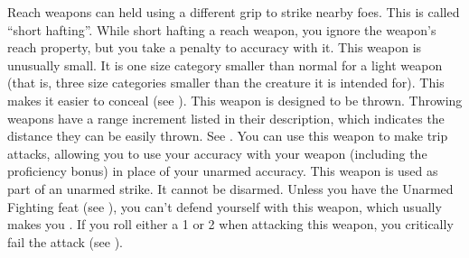 Reach weapons can held using a different grip to strike nearby foes. This is called ``short hafting''. While short hafting a reach weapon, you ignore the weapon's reach property, but you take a  penalty to accuracy with it.
 This weapon is unusually small. It is one size category smaller than normal for a light weapon (that is, three size categories smaller than the creature it is intended for). This makes it easier to conceal (see ).
 This weapon is designed to be thrown. Throwing weapons have a range increment listed in their description, which indicates the distance they can be easily thrown. See .
 You can use this weapon to make trip attacks, allowing you to use your accuracy with your weapon (including the  proficiency bonus) in place of your unarmed accuracy.
 This weapon is used as part of an unarmed strike. It cannot be disarmed. Unless you have the Unarmed Fighting feat (see ), you can't defend yourself with this weapon, which usually makes you .
 If you roll either a 1 or 2 when attacking this weapon, you critically fail the attack (see ).

